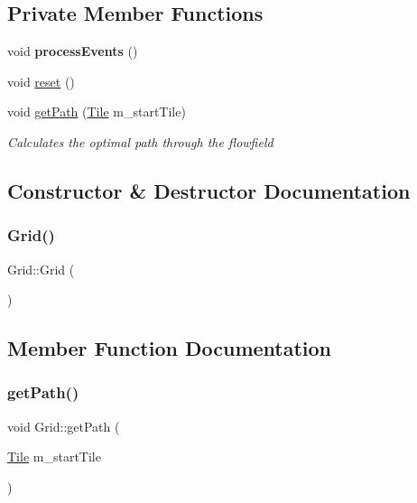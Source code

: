 \subsection*{Private Member Functions}
\begin{DoxyCompactItemize}
\item 
\mbox{\label{class_grid_aa2e8854a59c73d3e077177942cd0712b}} 
void {\bfseries process\+Events} ()
\item 
void \mbox{\hyperlink{class_grid_a153095310e11b93d349d12f218b5e73e}{reset}} ()
\item 
void \mbox{\hyperlink{class_grid_a602801a4d9bdcded43e2cf7f4240ccad}{get\+Path}} (\mbox{\hyperlink{class_tile}{Tile}} m\+\_\+start\+Tile)
\begin{DoxyCompactList}\small\item\em Calculates the optimal path through the flowfield \end{DoxyCompactList}\end{DoxyCompactItemize}


\subsection{Constructor \& Destructor Documentation}
\mbox{\label{class_grid_a4ac9ff4f63552b4c61ff90fcb35ad66c}} 
\subsubsection{\texorpdfstring{Grid()}{Grid()}}
{\footnotesize\ttfamily Grid\+::\+Grid (\begin{DoxyParamCaption}{ }\end{DoxyParamCaption})}







\subsection{Member Function Documentation}
\mbox{\label{class_grid_a602801a4d9bdcded43e2cf7f4240ccad}} 
\subsubsection{\texorpdfstring{getPath()}{getPath()}}
{\footnotesize\ttfamily void Grid\+::get\+Path (\begin{DoxyParamCaption}\item[{\mbox{\hyperlink{class_tile}{Tile}}}]{m\+\_\+start\+Tile }\end{DoxyParamCaption})\hspace{0.3cm}{\ttfamily [private]}}



